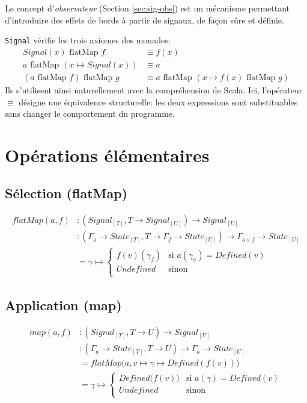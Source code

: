 	Le concept d'\emph{observateur} (Section \ref{sec:sig-obs}) est un mécanisme permettant d'introduire des effets de bords à partir de signaux, de façon sûre et définie.
	
	\texttt{Signal} vérifie les trois axiomes des monades\cite{haskell-monad-laws}:
	\begin{align*}
		Signal(x) \text{ flatMap } f &\equiv f(x) \\
		a \text{ flatMap } (x \mapsto Signal(x)) &\equiv a \\
		(a \text{ flatMap } f)  \text{ flatMap } g &\equiv
			a \text{ flatMap } (x \mapsto f(x)  \text{ flatMap } g) 
	\end{align*}
	Ils s'utilisent ainsi naturellement avec la compréhension  de Scala. Ici, l'opérateur $\equiv$ désigne une équivalence structurelle: les deux expressions sont substituables sans changer le comportement du programme.

\section{Opérations élémentaires}

	\subsection{Sélection (flatMap)}
		
		\begin{align*}
			flatMap(a, f)
				&\colon (Signal_{[T]}, T \to Signal_{[U]}) \to Signal_{[U]} \\
				&\colon (\Gamma_a \to State_{[T]}, T \to \Gamma_f \to State_{[U]}) \to \Gamma_{a \times f} \to State_{[U]} \\
				&= \gamma \mapsto \begin{cases}
					f(v)(\gamma_f) & \text{si } a(\gamma_a) = Defined(v)\\
					Undefined & \text{sinon}\\
				\end{cases}
		\end{align*}
	
	\subsection{Application (map)}
		
		\begin{align*}
			map(a, f)
				&\colon (Signal_{[T]}, T \to U) \to Signal_{[U]} \\
				&\colon (\Gamma_a \to State_{[T]}, T \to U) \to \Gamma_a \to State_{[U]} \\
				&= flatMap \big( a, v \mapsto \gamma \mapsto Defined(f(v)) \big)\\
				&= \gamma \mapsto \begin{cases}
					Defined \big(f (v) \big) & \text{si } a(\gamma) = Defined(v)\\
					Undefined & \text{sinon}\\
				\end{cases}
		\end{align*}
	
